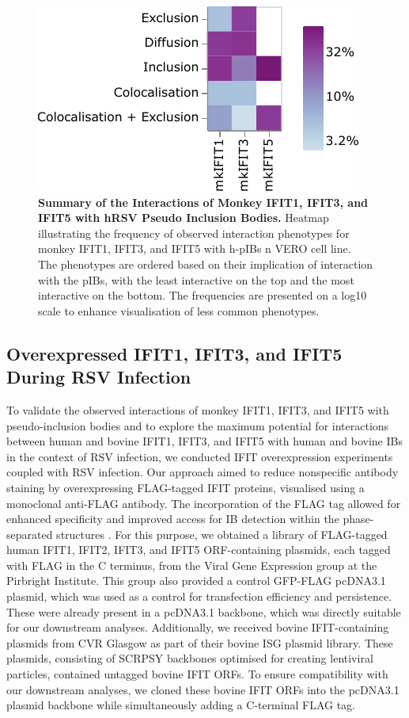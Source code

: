 \begin{figure}
    \centering
    \includegraphics[width=0.6\linewidth]{09. Chapter 4/Figs/heatmap-vero-hnhp-i135.pdf}
    \caption[Summary of the Interactions of Monkey IFIT1, IFIT3, and IFIT5 with hRSV Pseudo Inclusion Bodies.]{\textbf{Summary of the Interactions of Monkey IFIT1, IFIT3, and IFIT5 with hRSV Pseudo Inclusion Bodies.} Heatmap illustrating the frequency of observed interaction phenotypes for monkey IFIT1, IFIT3, and IFIT5 with h-pIBs n VERO cell line. The phenotypes are ordered based on their implication of interaction with the pIBs, with the least interactive on the top and the most interactive on the bottom. The frequencies are presented on a log10 scale to enhance visualisation of less common phenotypes.}
    \label{fig:Summary of the Interactions of Monkey IFIT1, IFIT3, and IFIT5 with hRSV Pseudo Inclusion Bodies}
\end{figure}

\subsection{Overexpressed IFIT1, IFIT3, and IFIT5 During RSV Infection} \label{subsec:Overexpressed IFIT1, IFIT3, and IFIT5 During RSV Infection}
To validate the observed interactions of monkey IFIT1, IFIT3, and IFIT5 with pseudo-inclusion bodies and to explore the maximum potential for interactions between human and bovine IFIT1, IFIT3, and IFIT5 with human and bovine IBs in the context of RSV infection, we conducted IFIT overexpression experiments coupled with RSV infection. Our approach aimed to reduce nonspecific antibody staining by overexpressing FLAG-tagged IFIT proteins, visualised using a monoclonal anti-FLAG antibody. The incorporation of the FLAG tag allowed for enhanced specificity and improved access for IB detection within the phase-separated structures \cite{Munro1984Use70.}. For this purpose, we obtained a library of FLAG-tagged human IFIT1, IFIT2, IFIT3, and IFIT5 ORF-containing plasmids, each tagged with FLAG in the C terminus, from the Viral Gene Expression group at the Pirbright Institute. This group also provided a control GFP-FLAG pcDNA3.1 plasmid, which was used as a control for transfection efficiency and persistence. These were already present in a pcDNA3.1 backbone, which was directly suitable for our downstream analyses. Additionally, we received bovine IFIT-containing plasmids from CVR Glasgow as part of their bovine ISG plasmid library. These plasmids, consisting of SCRPSY backbones optimised for creating lentiviral particles, contained untagged bovine IFIT ORFs. To ensure compatibility with our downstream analyses, we cloned these bovine IFIT ORFs into the pcDNA3.1 plasmid backbone while simultaneously adding a C-terminal FLAG tag.

